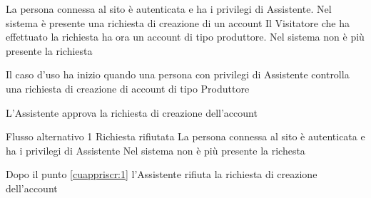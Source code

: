 {}
{La persona connessa al sito è autenticata e ha i privilegi di  Assistente. Nel sistema è presente una richiesta di creazione di un account}
{Il Visitatore che ha effettuato la richiesta ha ora un account di tipo produttore. Nel sistema non è più presente la richiesta}
{\begin{enumCU}
	\item Il caso d'uso ha inizio quando una persona con privilegi di Assistente controlla una richiesta di creazione di account di tipo Produttore \label{cuappriscr:1}
	\item L'Assistente approva la richiesta di creazione dell'account
\end{enumCU}}
%
{Flusso alternativo 1}%
{Richiesta rifiutata}%
{La persona connessa al sito è autenticata e ha i privilegi di Assistente}%
{Nel sistema non è più presente la richesta}%
{\begin{enumCU}
		\item Dopo il punto \ref{cuappriscr:1} l'Assistente rifiuta la richiesta di creazione dell'account
	\end{enumCU}}%

